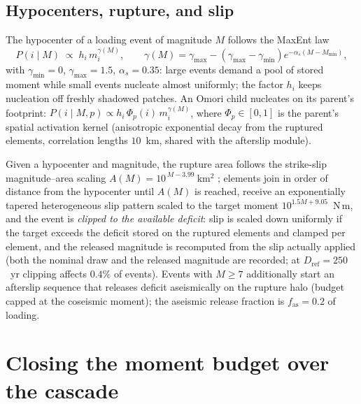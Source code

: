 \documentclass[11pt]{article}
\newcommand{\Mmin}{M_{\min}}
\newcommand{\Dref}{D_{\mathrm{ref}}}
\newcommand{\fas}{f_{\mathrm{as}}}
\begin{document}
\subsection{Hypocenters, rupture, and slip}
\label{sec:space}

The hypocenter of a loading event of magnitude $M$ follows the MaxEnt law
\begin{equation}
  P(i \mid M) \;\propto\; h_i\, m_i^{\gamma(M)},
  \qquad
  \gamma(M) = \gamma_{\max} - (\gamma_{\max}-\gamma_{\min})
  e^{-\alpha_s (M - \Mmin)},
\label{eq:spatial}
\end{equation}
with $\gamma_{\min} = 0$, $\gamma_{\max} = 1.5$, $\alpha_s = 0.35$: large events demand
a pool of stored moment while small events nucleate almost uniformly; the factor $h_i$
keeps nucleation off freshly shadowed patches. An Omori child nucleates on its parent's
footprint: $P(i \mid M, p) \propto h_i\, \Phi_p(i)\, m_i^{\gamma(M)}$, where
$\Phi_p \in [0,1]$ is the parent's spatial activation kernel (anisotropic exponential
decay from the ruptured elements, correlation lengths $10$~km, shared with the afterslip
module).

Given a hypocenter and magnitude, the rupture area follows the strike-slip
magnitude--area scaling $A(M) = 10^{\,M - 3.99}\ \mathrm{km^2}$ \cite{allen2017};
elements join in order of distance from the hypocenter until $A(M)$ is reached, receive
an exponentially tapered heterogeneous slip pattern scaled to the target moment
$10^{1.5M+9.05}$~N\,m, and the event is \emph{clipped to the available deficit}: slip is
scaled down uniformly if the target exceeds the deficit stored on the ruptured elements
and clamped per element, and the released magnitude is recomputed from the slip actually
applied (both the nominal draw and the released magnitude are recorded; at
$\Dref = 250$~yr clipping affects $0.4\%$ of events). Events with $M \ge 7$ additionally
start an afterslip sequence that releases deficit aseismically on the rupture halo
(budget capped at the coseismic moment); the aseismic release fraction is
$\fas = 0.2$ of loading.

\section{Closing the moment budget over the cascade}
\label{sec:budget}
\end{document}
